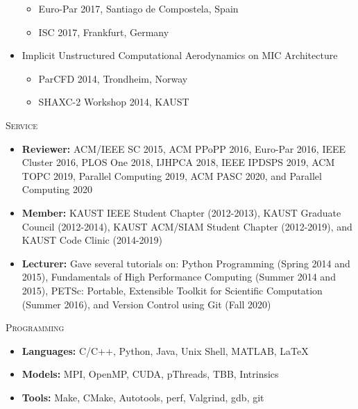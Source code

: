 \documentclass[10pt,a4paper]{article}
\begin{document}
\begin{cv}
\begin{cvlist}{}
\begin{itemize}[label=\raisebox{0.25ex}{\tiny$\bullet$},nosep, leftmargin=*]
  \begin{itemize}
  \item
  Euro-Par 2017, Santiago de Compostela, Spain
  \item
  ISC 2017, Frankfurt, Germany
  \end{itemize}
  \item
  Implicit Unstructured Computational Aerodynamics on MIC Architecture
  \begin{itemize}
  \item
  ParCFD 2014, Trondheim, Norway
  \item
  SHAXC-2 Workshop 2014, KAUST
  \end{itemize}
\end{itemize}


\vspace{+2mm}
\item[\textsc{Service}]
\begin{itemize}[label=\raisebox{0.25ex}{\tiny$\bullet$},nosep, leftmargin=*]
\item
{\bf Reviewer:} ACM/IEEE SC 2015, ACM PPoPP 2016, Euro-Par 2016, IEEE Cluster 2016,
PLOS One 2018, IJHPCA 2018, IEEE IPDSPS 2019, ACM TOPC 2019, Parallel Computing 2019,
ACM PASC 2020, and Parallel Computing 2020
\item
{\bf Member:} KAUST IEEE Student Chapter (2012-2013),
KAUST Graduate Council (2012-2014), KAUST ACM/SIAM Student Chapter (2012-2019),
and KAUST Code Clinic (2014-2019)
\item
{\bf Lecturer:} Gave several tutorials on: Python Programming (Spring 2014 and 2015),
Fundamentals of High Performance Computing (Summer 2014 and 2015),
PETSc: Portable, Extensible Toolkit for Scientific Computation (Summer 2016),
and Version Control using Git (Fall 2020)
\end{itemize}


\vspace{+2mm}
\item[\textsc{Programming}]
\begin{itemize}[label=\raisebox{0.25ex}{\tiny$\bullet$},nosep, leftmargin=*]
\item
{\bf Languages:} C/C++, Python, Java, Unix Shell, MATLAB, \LaTeX
\item
{\bf Models:} MPI, OpenMP, CUDA, pThreads, TBB, Intrinsics
\item
{\bf Tools:} Make, CMake, Autotools, perf, Valgrind, gdb, git
\end{itemize}


\end{cvlist}

\end{cv}
\end{document}
